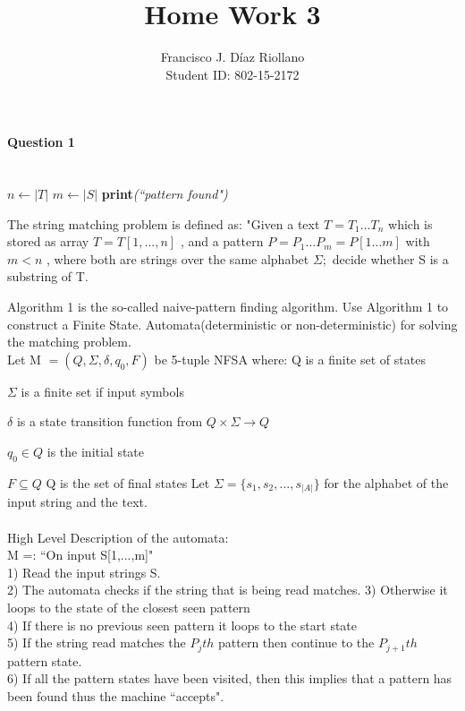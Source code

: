 \documentclass{report}
\title{Home Work 3}
\author{Francisco J. Díaz Riollano \\ Student ID: 802-15-2172 }
\newcommand{\me}[1]{
\begin{math}
#1
\end{math}
}
\begin{document}
\maketitle
\paragraph{\Large{Question 1\\ \\}}


\begin{algorithm}
  \begin{algorithmic}[1]
      \State $n\gets |T|$
      \State $m\gets |S|$
      	\State \textbf{print}\textit{(``pattern found")}
      \EndIf
      \EndFor     
    \EndProcedure
  \end{algorithmic}
\end{algorithm}


The string matching problem is defined as: "Given a text \me{T=T_1 ... T_n} which is stored as array \me{T= T[1,...,n]} , and a pattern \me{P = P_1 ... P_m = P[1...m]} with \me{m<n}, where both are strings over the same alphabet \me{\Sigma;}decide whether S is a substring of T.

Algorithm 1 is the so-called naive-pattern finding algorithm. Use Algorithm 1 to construct a Finite State. Automata(deterministic or non-deterministic) for solving the matching problem. 
\\

Let M \me{=(Q,\Sigma,\delta,q_0,F)} be 5-tuple NFSA where: \newline
Q is a finite set of states \newline
\me{\Sigma} is a finite set if input symbols \newline
\me{\delta} is a state transition function from \me{Q \times \Sigma \rightarrow Q} \newline
\me{q_0 \in Q} is the initial state \newline
\me{F \subseteq Q} Q is the set of final states \newline
Let \me{\Sigma=\{s_1,s_2,...,s_{|A|}\}} for the alphabet of the input string and the text. \newline
\\
\\
High Level Description of the automata: \\
M =: ``On input S[1,...,m]" \\
1) Read the input strings S. \\
2) The automata checks if the string that is being read matches.
3) Otherwise it loops to the state of the closest seen pattern \\
4) If there is no previous seen pattern it loops to the start state\\
5) If the string read matches the $P_jth$ pattern then continue to the $P_{j+1}th$ pattern state.\\
6) If all the pattern states have been visited, then this implies that a pattern has been found thus the machine ``accepts".\\
\end{document}
